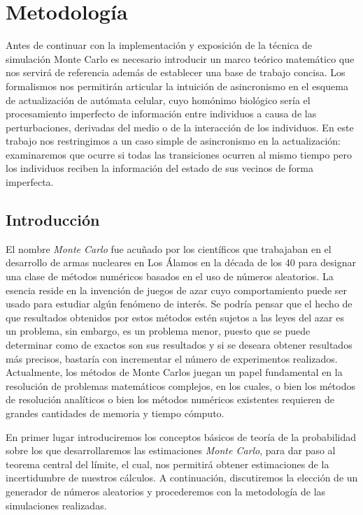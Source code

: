 \documentclass[../proyecto.tex]{memoir}
\begin{document}
\chapter{Metodología}

Antes de continuar con la implementación y exposición de la técnica de simulación Monte Carlo es necesario introducir un marco teórico matemático que nos servirá de referencia además de establecer una base de trabajo concisa. Los formalismos nos permitirán articular la intuición de asincronismo en el esquema de actualización de autómata celular, cuyo homónimo biológico sería el procesamiento imperfecto de información entre individuos a causa de las perturbaciones, derivadas del medio o de la interacción de los individuos. En este trabajo nos restringimos a un caso simple de asincronismo en la actualización: examinaremos que ocurre si todas las transiciones ocurren al mismo tiempo pero los individuos reciben la información del estado de sus vecinos de forma imperfecta.

\section{Introducción}

El nombre \textit{Monte Carlo} fue acuñado por los científicos que trabajaban en el desarrollo de armas nucleares en Los Álamos en la década de los 40 para designar una clase de métodos numéricos basados en el uso de números aleatorios. La esencia reside en la invención de juegos de azar cuyo comportamiento puede ser usado para estudiar algún fenómeno de interés. Se podría pensar que el hecho de que resultados obtenidos por estos métodos estén sujetos a las leyes del azar es un problema, sin embargo, es un problema menor, puesto que se puede determinar como de exactos son sus resultados y si se deseara obtener resultados más precisos, bastaría con incrementar el número de experimentos realizados. Actualmente, los métodos de Monte Carlos juegan un papel fundamental en la resolución de problemas matemáticos complejos, en los cuales, o bien los métodos de resolución analíticos o bien los métodos numéricos existentes requieren de grandes cantidades de memoria y tiempo cómputo.


En primer lugar introduciremos los conceptos básicos de teoría de la probabilidad sobre los que desarrollaremos las estimaciones \textit{Monte Carlo}, para dar paso al teorema central del límite, el cual, nos permitirá obtener estimaciones de la incertidumbre de nuestros cálculos. A continuación, discutiremos la elección de un generador de números aleatorios y procederemos con la metodología de las simulaciones realizadas.
\end{document}
